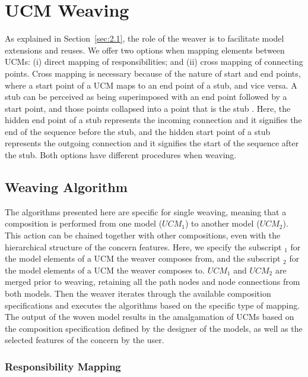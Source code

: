 
\section{UCM Weaving} \label{sec:3.2}

As explained in Section~\ref{sec:2.1}, the role of the weaver is to facilitate model extensions and reuses. We offer two options when mapping elements between UCMs: (i) direct mapping of responsibilities; and (ii) cross mapping of connecting points. Cross mapping is necessary because of the nature of start and end points, where a start point of a UCM maps to an end point of a stub, and vice versa. A stub can be perceived as being superimposed with an end point followed by a start point, and those points collapsed into a point that is the stub \cite{buhr1995use}. Here, the hidden end point of a stub represents the incoming connection and it signifies the end of the sequence before the stub, and the hidden start point of a stub represents the outgoing connection and it signifies the start of the sequence after the stub. Both options have different procedures when weaving.

\subsection{Weaving Algorithm}

The algorithms presented here are specific for single weaving, meaning that a composition is performed from one model ($UCM_1$) to another model ($UCM_2$). This action can be chained together with other compositions, even with the hierarchical structure of the concern features. Here, we specify the subscript $_1$ for the model elements of a UCM the weaver composes from, and the subscript $_2$ for the model elements of a UCM the weaver composes to. $UCM_1$ and $UCM_2$ are merged prior to weaving, retaining all the path nodes and node connections from both models. Then the weaver iterates through the available composition specifications and executes the algorithms based on the specific type of mapping. The output of the woven model results in the amalgamation of UCMs based on the composition specification defined by the designer of the models, as well as the selected features of the concern by the user.

\subsubsection{Responsibility Mapping} \label{sec:3.2.1.1}

